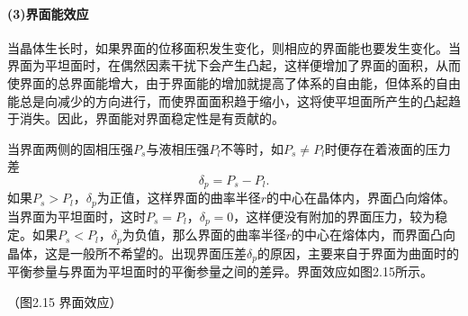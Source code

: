 \paragraph{(3)界面能效应}当晶体生长时，如果界面的位移面积发生变化，则相应的界面能也要发生变化。当界面为平坦面时，在偶然因素干扰下会产生凸起，这样便增加了界面的面积，从而使界面的总界面能增大，由于界面能的增加就提高了体系的自由能，但体系的自由能总是向减少的方向进行，而使界面面积趋于缩小，这将使平坦面所产生的凸起趋于消失。因此，界面能对界面稳定性是有贡献的。

当界面两侧的固相压强$P_s$与液相压强$P_l$不等时，如$P_s\neq P_l$时便存在着液面的压力差
\begin{equation}
\delta_p=P_s-P_l.
\end{equation}
如果$P_s>P_l$，$\delta_p$为正值，这样界面的曲率半径$r$的中心在晶体内，界面凸向熔体。当界面为平坦面时，这时$P_s=P_l$，$\delta_p=0$，这样便没有附加的界面压力，较为稳定。如果$P_s<P_l$，$\delta_p$为负值，那么界面的曲率半径$r$的中心在熔体内，而界面凸向晶体，这是一般所不希望的。出现界面压差$\delta_p$的原因，主要来自于界面为曲面时的平衡参量与界面为平坦面时的平衡参量之间的差异。界面效应如图2.15所示。

（图2.15 界面效应）